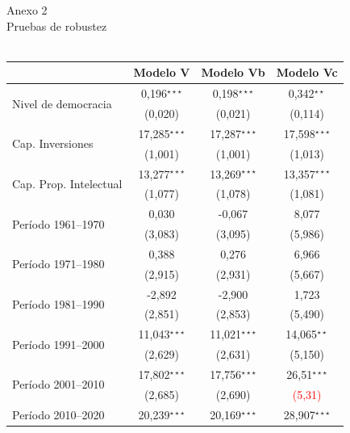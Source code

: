 \documentclass[a4paper]{tufte-handout}
\begin{document}
\begin{table}[h!]
  \centering
  \selectfont
   \smallskip\noindent\small Anexo 2 \\ Pruebas de robustez \\~\\
  \begin{tabular}{l c c c}
    \toprule
     & Modelo V & Modelo Vb & Modelo Vc \\ \midrule
    \multirow{2}{*}{Nivel de democracia} & 0,196$^{\star\star\star}$ & 0,198$^{\star\star\star}$ & 0,342$^{\star\star}$ \\
    & {\scriptsize (0,020)} & {\scriptsize (0,021)} & {\scriptsize (0,114)} \\ 
    \multirow{2}{*}{Cap. Inversiones} & 17,285$^{\star\star\star}$ & 17,287$^{\star\star\star}$ & 17,598$^{\star\star\star}$ \\
    & {\scriptsize (1,001)} & {\scriptsize (1,001)} & {\scriptsize (1,013)} \\
    \multirow{2}{*}{Cap. Prop. Intelectual} & 13,277$^{\star\star\star}$ & 13,269$^{\star\star\star}$ & 13,357$^{\star\star\star}$ \\
    & {\scriptsize (1,077)} & {\scriptsize (1,078)} & {\scriptsize (1,081)}\\
    \multirow{2}{*}{Período 1961--1970} & 0,030 & -0,067 & 8,077 \\
    & {\scriptsize (3,083)} & {\scriptsize (3,095)} & {\scriptsize (5,986)} \\
    \multirow{2}{*}{Período 1971--1980} & 0,388 & 0,276 & 6,966 \\
    & {\scriptsize (2,915)} & {\scriptsize (2,931)} & {\scriptsize (5,667)} \\
    \multirow{2}{*}{Período  1981--1990} & -2,892 & -2,900 & 1,723 \\
    & {\scriptsize (2,851)} & {\scriptsize (2,853)} & {\scriptsize (5,490)} \\
    \multirow{2}{*}{Período 1991--2000} & 11,043$^{\star\star\star}$ & 11,021$^{\star\star\star}$  & 14,065$^{\star\star}$ \\
    & {\scriptsize (2,629)} & {\scriptsize (2,631)} & {\scriptsize (5,150)} \\ 
    \multirow{2}{*}{Período  2001--2010} & 17,802$^{\star\star\star}$ & 17,756$^{\star\star\star}$ & 26,51$^{\star\star\star}$ \\
    & {\scriptsize (2,685)} & {\scriptsize (2,690)} & {\scriptsize \textcolor{red}{(5,31)}} \\ 
    \multirow{2}{*}{Período 2010--2020} & 20,239$^{\star\star\star}$ & 20,169$^{\star\star\star}$ & 28,907$^{\star\star\star}$ \\

\end{tabular}
\end{table}
\end{document}
